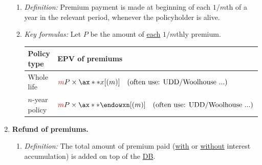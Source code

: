 \begin{enumerate}
\begin{enumerate}[label={(\arabic*)}]
\item \emph{Definition:} Premium payment is made at beginning of each \(1/m\)th
of a year in the relevant period, whenever the policyholder is alive.
\item \emph{Key formulas:} Let \(P\) be the amount of \underline{each}
\(1/m\)thly premium.
\begin{center}
\begin{tabular}{ll}
\toprule
Policy type&EPV of premiums \\
\midrule
Whole life&\(\rc{m}P\times \ax**{x}[(m)]\text{\quad(often use: UDD/Woolhouse ...)}\) \\
\(n\)-year policy&\(\rc{m}P\times \ax**{\endowxn}[(m)]\text{\quad(often use: UDD/Woolhouse ...)}\) \\
\bottomrule
\end{tabular}
\end{center}
\end{enumerate}
\item \label{it:prem-refund} \textbf{Refund of premiums.}
\begin{enumerate}[label={(\arabic*)}]
\item \emph{Definition:} The total amount of premium paid (\underline{with} or
\underline{without} interest accumulation) is added on top of the
\underline{DB}.


\end{enumerate}
\end{enumerate}
